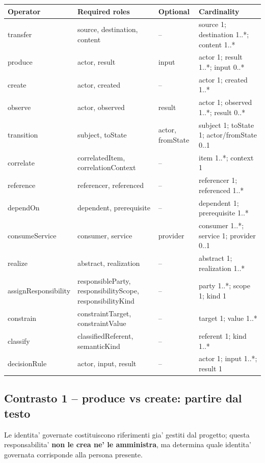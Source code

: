 \documentclass[11pt,a4paper]{article}
\begin{document}
\scriptsize
\begin{longtable}{L{0.16\textwidth}L{0.28\textwidth}L{0.21\textwidth}L{0.22\textwidth}}
\toprule
\textbf{Operator} & \textbf{Required roles} & \textbf{Optional} & \textbf{Cardinality} \\
\midrule\endhead
transfer & source, destination, content & -- & source 1; destination 1..*; content 1..* \\
produce & actor, result & input & actor 1; result 1..*; input 0..* \\
create & actor, created & -- & actor 1; created 1..* \\
observe & actor, observed & result & actor 1; observed 1..*; result 0..* \\
transition & subject, toState & actor, fromState & subject 1; toState 1; actor/fromState 0..1 \\
correlate & correlatedItem, correlationContext & -- & item 1..*; context 1 \\
reference & referencer, referenced & -- & referencer 1; referenced 1..* \\
dependOn & dependent, prerequisite & -- & dependent 1; prerequisite 1..* \\
consumeService & consumer, service & provider & consumer 1..*; service 1; provider 0..1 \\
realize & abstract, realization & -- & abstract 1; realization 1..* \\
assignResponsibility & responsibleParty, responsibilityScope, responsibilityKind & -- & party 1..*; scope 1; kind 1 \\
constrain & constraintTarget, constraintValue & -- & target 1; value 1..* \\
classify & classifiedReferent, semanticKind & -- & referent 1; kind 1..* \\
decisionRule & actor, input, result & -- & actor 1; input 1..*; result 1 \\
\bottomrule
\end{longtable}
\normalsize

\subsection{Contrasto 1 -- produce vs create: partire dal testo}

\begin{sourcebox}
Le identita' governate costituiscono riferimenti gia' gestiti dal progetto; questa responsabilita' \textbf{non le crea ne' le amministra}, ma determina quale identita' governata corrisponde alla persona presente.
\end{sourcebox}
\end{document}
